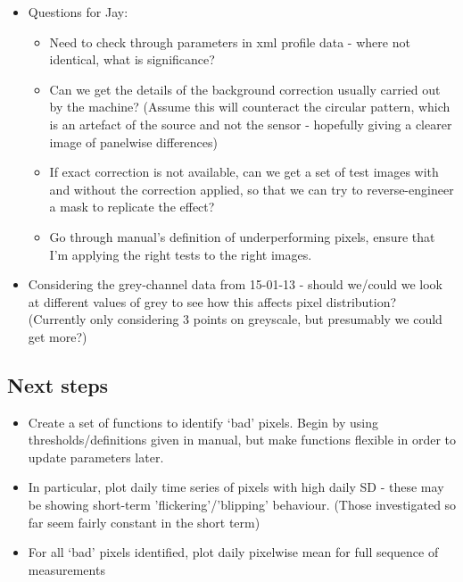 \documentclass[10pt,fleqn]{article}
\begin{document}
\begin{itemize}
\item
Questions for Jay:
\begin{itemize}
\item
Need to check through parameters in xml profile data - where not identical, what is significance?

\item
Can we get the details of the background correction usually carried out by the machine? (Assume this will counteract the circular pattern, which is an artefact of the source and not the sensor - hopefully giving a clearer image of panelwise differences)

\item
If exact correction is not available, can we get a set of test images with and without the correction applied, so that we can try to reverse-engineer a mask to replicate the effect?

\item
Go through manual's definition of underperforming pixels, ensure that I'm applying the right tests to the right images.

\end{itemize}

\item
Considering the grey-channel data from 15-01-13 - should we/could we look at different values of grey to see how this affects pixel distribution? (Currently only considering 3 points on greyscale, but presumably we could get more?)



\end{itemize}

\subsection*{Next steps}

\begin{itemize}

\item
Create a set of functions to identify `bad' pixels. Begin by using thresholds/definitions given in manual, but make functions flexible in order to update parameters later.

\item
In particular, plot daily time series of pixels with high daily SD - these may be showing short-term 'flickering'/'blipping' behaviour. (Those investigated so far seem fairly constant in the short term)

\item
For all `bad' pixels identified, plot daily pixelwise mean for full sequence of measurements

\end{itemize}

\end{document}
